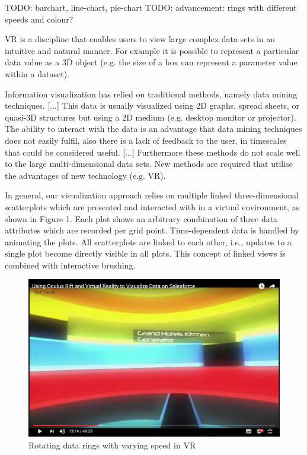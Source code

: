 TODO: barchart, line-chart, pie-chart
TODO: advancement: rings with different speeds and colour?
\cite{CodeScience2015}

VR is a discipline that enables users to view large complex data sets in an intuitive and natural manner. For example it is possible to represent a particular data value as a 3D object (e.g. the size of a box can represent a parameter value within a dataset).
\cite{Jamieson2007}

Information visualization has relied on traditional methods, namely data mining techniques. [...] This data is usually visualized using 2D graphs, spread sheets, or quasi-3D structures but using a 2D medium (e.g. desktop monitor or projector). The ability to interact with the data is an advantage that data mining techniques does not easily fulfil, also there is a lack of feedback to the user, in timescales that could be considered useful. [...] Furthermore these methods do not scale well to the large multi-dimensional data sets. New methods are required that utilise the advantages of new technology (e.g. VR).
\cite{Jamieson2007}

In general, our visualization approach relies on multiple linked three-dimensional scatterplots which are presented and interacted with in a virtual environment, as shown in Figure 1. Each plot shows an arbitrary combination of three data attributes which are recorded per grid point. Time-dependent data is handled by animating the plots. All scatterplots are linked to each other, i.e., updates to a single plot become directly visible in all plots. This concept of linked views is combined with interactive brushing.
\cite{Hentschel2009}

\begin{figure}[h]
	\begin{center}
		\includegraphics[width=14cm]{03_Figures/05_LitReview/CodeScience2015.png}
		\caption[Rotating data rings with varying speed in VR]{Rotating data rings with varying speed in VR \citep{CodeScience2015}}
		\label{fig:rotatingrings}
	\end{center}
\end{figure}


